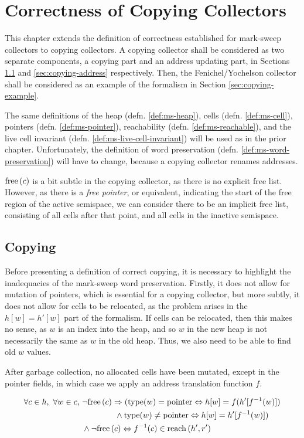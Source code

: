 \chapter{Correctness of Copying Collectors}
\label{sec:copying}

This chapter extends the definition of correctness established for
mark-sweep collectors to copying collectors. A copying collector shall
be considered as two separate components, a copying part and an
address updating part, in Sections \ref{sec:copying-copying} and
\ref{sec:copying-address} respectively. Then, the Fenichel/Yochelson
collector shall be considered as an example of the formalism in
Section \ref{sec:copying-example}.

The same definitions of the heap (defn. \ref{def:ms-heap}), cells
(defn. \ref{def:ms-cell}), pointers (defn. \ref{def:ms-pointer}),
reachability (defn. \ref{def:ms-reachable}), and the live cell
invariant (defn. \ref{def:ms-live-cell-invariant}) will be used as in
the prior chapter. Unfortunately, the definition of word preservation
(defn. \ref{def:ms-word-preservation}) will have to change, because a
copying collector renames addresses.

$\mathrm{free}\left(c\right)$ is a bit subtle in the copying collector, as there is no
explicit free list. However, as there is a \textit{free pointer}, or
equivalent, indicating the start of the free region of the active
semispace, we can consider there to be an implicit free list,
consisting of all cells after that point, and all cells in the
inactive semispace.

\section{Copying}
\label{sec:copying-copying}

Before presenting a definition of correct copying, it is necessary to
highlight the inadequacies of the mark-sweep word
preservation. Firstly, it does not allow for mutation of pointers,
which is essential for a copying collector, but more subtly, it does
not allow for cells to be relocated, as the problem arises in the
$h[w] = h'[w]$ part of the formalism. If cells can be relocated, then
this makes no sense, as $w$ is an index into the heap, and so $w$ in
the new heap is not necessarily the same as $w$ in the old heap. Thus,
we also need to be able to find old $w$ values.

\begin{definition}
  \label{def:c-correct-copying}
  After garbage collection, no allocated cells have been mutated,
  except in the pointer fields, in which case we apply an address
  translation function $f$.

  \begin{align*}
    \forall c \in h,\ \forall w \in c,\ &\lnot\mathrm{free}\left(c\right) \Rightarrow
    (\mathrm{type}(w) = \mathrm{pointer} \Leftrightarrow h[w] = f(h'[f^{-1}(w)])\\
    &\quad\quad\quad\quad \land \mathrm{type}(w) \neq \mathrm{pointer}
    \Leftrightarrow h[w] = h'[f^{-1}(w)])\\
    &\land \lnot\mathrm{free}\left(c\right) \Leftrightarrow f^{-1}(c) \in \mathrm{reach}\left(h', r'\right)
  \end{align*}
\end{definition}

